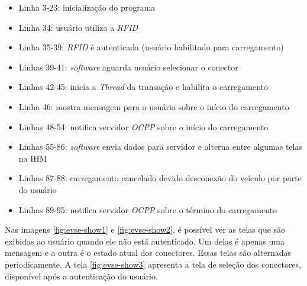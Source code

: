     \begin{itemize}
      \item Linha 3-23: inicialização do programa 
      

      \item Linha 34: usuário utiliza a \textit{\ac{RFID}}
      

      \item Linha 35-39: \textit{\ac{RFID}} é autenticada (usuário habilitado para carregamento)
      

      \item Linhas 39-41: \textit{software} aguarda usuário selecionar o conector
      

      \item Linhas 42-45: inicia a \textit{Thread} da transação e habilita o carregamento
      

      \item Linha 46: mostra mensagem para o usuário sobre o início do carregamento
      

      \item Linhas 48-54: notifica servidor \textit{\ac{OCPP}} sobre o início do carregamento
      

      \item Linhas 55-86: \textit{software} envia dados para servidor e alterna entre algumas telas na \ac{IHM}
      

      \item Linhas 87-88: carregamento cancelado devido desconexão do veículo por parte do usuário
      

      \item Linhas 89-95: notifica servidor \textit{\ac{OCPP}} sobre o término do carregamento
      
    \end{itemize}

    Nas imagens \ref{fig:evse-show1} e \ref{fig:evse-show2}, é possível ver as telas que são exibidas ao usuário quando ele não está autenticado. Um delas é apenas uma mensagem e a outra é o estado atual dos conectores. Essas telas são alternadas periodicamente. A tela \ref{fig:evse-show3} apresenta a tela de seleção dos conectores, disponível após a autenticação do usuário.

